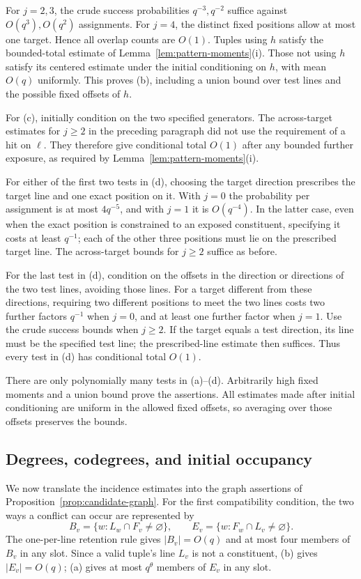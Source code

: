 For $j=2,3$, the crude success probabilities $q^{-3},q^{-2}$ suffice
against $O(q^3),O(q^2)$ assignments. For $j=4$, the distinct fixed
positions allow at most one target. Hence all overlap counts are
$O(1)$. Tuples using $h$ satisfy the bounded-total estimate of
Lemma~\ref{lem:pattern-moments}(i). Those not using $h$ satisfy its
centered estimate under the initial conditioning on $h$, with mean
$O(q)$ uniformly. This proves (b), including a union bound over test
lines and the possible fixed offsets of $h$.

For (c), initially condition on the two specified generators. The
across-target estimates for $j\ge2$ in the preceding paragraph did not
use the requirement of a hit on $\ell$. They therefore give conditional
total $O(1)$ after any bounded further exposure, as required by
Lemma~\ref{lem:pattern-moments}(i).

For either of the first two tests in (d), choosing the target direction
prescribes the target line and one exact position on it. With $j=0$
the probability per assignment is at most $4q^{-5}$, and with $j=1$
it is $O(q^{-4})$. In the latter case, even when the exact position is
constrained to an exposed constituent, specifying it costs at least
$q^{-1}$; each of the other three positions must lie on the prescribed
target line. The across-target bounds for $j\ge2$ suffice as before.

For the last test in (d), condition on the offsets in the direction or
directions of the two test lines, avoiding those lines. For a target
different from these directions, requiring two different positions to
meet the two lines costs two further factors $q^{-1}$ when $j=0$, and
at least one further factor when $j=1$. Use the crude success bounds
when $j\ge2$. If the target equals a test direction, its line must be
the specified test line; the prescribed-line estimate then suffices.
Thus every test in (d) has conditional total $O(1)$.

There are only polynomially many tests in (a)--(d). Arbitrarily high
fixed moments and a union bound prove the assertions. All estimates made
after initial conditioning are uniform in the allowed fixed offsets,
so averaging over those offsets preserves the bounds.

\subsection{Degrees, codegrees, and initial occupancy}

We now translate the incidence estimates into the graph assertions of
Proposition~\ref{prop:candidate-graph}. For the first compatibility
condition, the two ways a conflict can occur are represented by
\[
 B_v=\{w:L_w\cap F_v\ne\varnothing\},\qquad
 E_v=\{w:F_w\cap L_v\ne\varnothing\}.
\]
The one-per-line retention rule gives $|B_v|=O(q)$ and at most four
members of $B_v$ in any slot. Since a valid tuple's line $L_v$ is not
a constituent, (b) gives $|E_v|=O(q)$; (a) gives at most $q^\theta$
members of $E_v$ in any slot.

